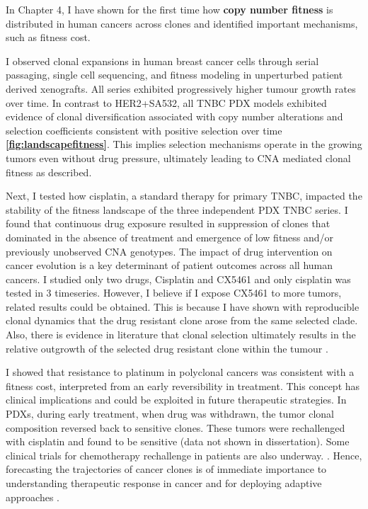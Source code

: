 In Chapter 4, I have shown for the first time how \textbf{copy number fitness} is distributed in human cancers across clones and identified important mechanisms, such as fitness cost. 

I observed clonal expansions in human breast cancer cells through serial passaging, single cell sequencing, and fitness modeling in unperturbed patient derived xenografts. 
All series exhibited progressively higher tumour growth rates over time. In contrast to HER2+SA532, all TNBC PDX models exhibited evidence of clonal diversification associated with copy number alterations and selection coefficients consistent with positive selection over time \textbf{\autoref{fig:landscapefitness}}. This implies selection mechanisms operate in the growing tumors even without drug pressure, ultimately leading to CNA mediated clonal fitness as described. 

Next, I tested how cisplatin, a standard therapy for primary TNBC, impacted the stability of the fitness landscape of the three independent PDX TNBC series. 
 I found that continuous drug exposure resulted in suppression of clones that dominated in the absence of treatment and emergence of low fitness and/or previously unobserved CNA genotypes. 
The impact of drug intervention on cancer evolution is a key determinant of patient outcomes across all human cancers.  
I studied only two drugs, Cisplatin and CX5461 and only cisplatin was tested in 3 timeseries. However, I believe if I expose CX5461 to more tumors, related results could be obtained. This is because I have shown with reproducible clonal dynamics that the drug resistant clone arose from the same selected clade. Also, there is evidence in literature that clonal selection ultimately results in the relative outgrowth of the selected drug resistant clone within the tumour \cite{aparicio2013implications, graham2017measuring, wu2012clonal, liu2009copy}. 

I showed that resistance to platinum in polyclonal cancers was consistent with a fitness cost, interpreted from an early reversibility in treatment. This concept has clinical implications and could be exploited in future therapeutic strategies. In PDXs, during early treatment, when drug was withdrawn, the tumor clonal composition reversed back to sensitive clones. These tumors were rechallenged with cisplatin and found to be sensitive (data not shown in dissertation). Some clinical trials for chemotherapy rechallenge in patients are also underway. \cite{neuzillet2016platinum, cremolini2019rechallenge}.
Hence, forecasting the trajectories of cancer clones is of immediate importance to understanding therapeutic response in cancer and for deploying adaptive approaches \cite{Vasan2019-mt}.

